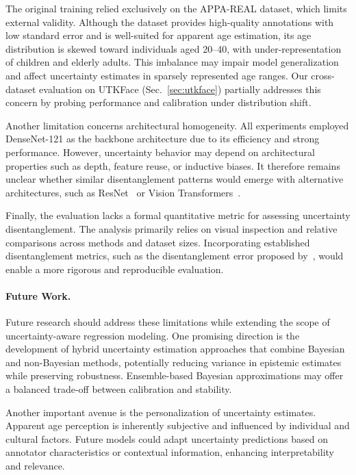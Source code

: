 \documentclass[runningheads]{llncs}
\begin{document}
The original training relied exclusively on the APPA-REAL dataset, which limits external validity. Although the dataset provides high-quality annotations with low standard error and is well-suited for apparent age estimation, its age distribution is skewed toward individuals aged 20--40, with under-representation of children and elderly adults. This imbalance may impair model generalization and affect uncertainty estimates in sparsely represented age ranges. Our cross-dataset evaluation on UTKFace (Sec.~\ref{sec:utkface}) partially addresses this concern by probing performance and calibration under distribution shift.

Another limitation concerns architectural homogeneity. All experiments employed DenseNet-121 as the backbone architecture due to its efficiency and strong performance. However, uncertainty behavior may depend on architectural properties such as depth, feature reuse, or inductive biases. It therefore remains unclear whether similar disentanglement patterns would emerge with alternative architectures, such as ResNet~\cite{he2016deep} or Vision Transformers~\cite{dosovitskiy2021image}.

Finally, the evaluation lacks a formal quantitative metric for assessing uncertainty disentanglement. The analysis primarily relies on visual inspection and relative comparisons across methods and dataset sizes. Incorporating established disentanglement metrics, such as the disentanglement error proposed by~\cite{dejong2025measuring}, would enable a more rigorous and reproducible evaluation.

\paragraph{Future Work.}
Future research should address these limitations while extending the scope of uncertainty-aware regression modeling. One promising direction is the development of hybrid uncertainty estimation approaches that combine Bayesian and non-Bayesian methods, potentially reducing variance in epistemic estimates while preserving robustness. Ensemble-based Bayesian approximations may offer a balanced trade-off between calibration and stability.

Another important avenue is the personalization of uncertainty estimates. Apparent age perception is inherently subjective and influenced by individual and cultural factors. Future models could adapt uncertainty predictions based on annotator characteristics or contextual information, enhancing interpretability and relevance.
\end{document}
